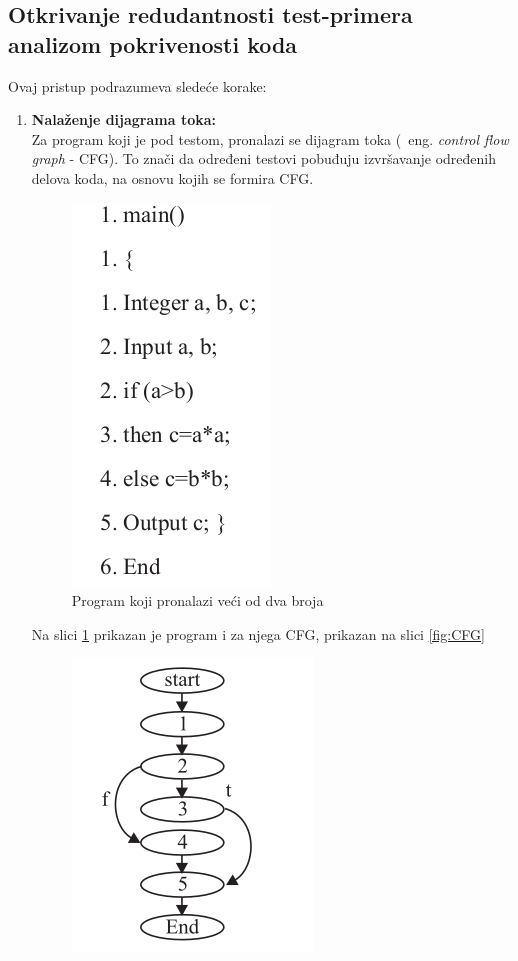 \documentclass[a4paper]{article}
\theoremstyle{definition}
\begin{document}
\subsection{Otkrivanje redudantnosti test-primera analizom pokrivenosti koda}
\label{subsec:drugi}

Ovaj pristup\cite{druginacin} podrazumeva sledeće korake:
\begin{enumerate}
    \item \textbf{Nalaženje dijagrama toka:}\\
    Za program koji je pod testom, pronalazi se dijagram toka (~eng. \emph{control flow graph} - CFG). To znači da određeni testovi pobuđuju izvršavanje određenih delova koda, na osnovu kojih se formira CFG.
        \begin{figure}[h!]
        \begin{center}
        \includegraphics[scale=0.25]{program.png}
        \end{center}
        \caption{Program koji pronalazi veći od dva broja}
        \label{fig:program}
        \end{figure}
        Na slici \ref{fig:program} prikazan je program i za njega CFG, prikazan na slici \ref{fig:CFG}
        \begin{figure}[h!]
        \begin{center}
        \includegraphics[scale=0.25]{CFG.png}

\end{center}
\end{figure}
\end{enumerate}
\end{document}
